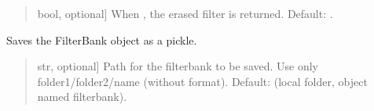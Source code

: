 \documentclass[letterpaper,10pt,english]{sphinxmanual}
\begin{document}
\begin{fulllineitems}
\begin{fulllineitems}
\begin{quote}
\begin{description}
\begin{description}
\sphinxlineitem{\sphinxstylestrong{return\_filter}}{[}bool, optional{]}
\sphinxAtStartPar
When , the erased filter is returned. Default: .

\end{description}

\end{description}\end{quote}

\end{fulllineitems}


\begin{fulllineitems}
\label{\detokenize{classes:dsptoolbox.classes.filterbank.FilterBank.save_filterbank}}
\pysigstartsignatures
{}
\pysigstopsignatures
\sphinxAtStartPar
Saves the FilterBank object as a pickle.
\begin{quote}\begin{description}
\begin{description}
\sphinxlineitem{\sphinxstylestrong{path}}{[}str, optional{]}
\sphinxAtStartPar
Path for the filterbank to be saved. Use only folder1/folder2/name
(without format). Default: 
(local folder, object named filterbank).

\end{description}

\end{description}\end{quote}

\end{fulllineitems}



\end{fulllineitems}
\end{document}
